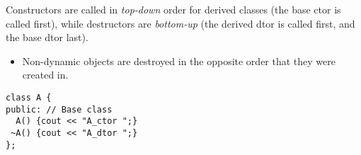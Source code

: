 \documentclass[7pt, twocolumn]{extarticle}
\newcommand{\myinline}[1]{\lstinline[basicstyle={\fontsize{5pt}{6}\ttfamily}]{#1}}
\begin{document}
\begin{small}
\begin{minipage}[h]{4.4cm}
\vspace{0.35ex}
Constructors are called in \textit{top-down} order for derived classes (the base ctor is called first), while destructors are \textit{bottom-up} (the derived dtor is called first, and the base dtor last). 

\smallskip
\begin{itemize}[leftmargin=*,align=parleft]
\setlength\itemsep{0pt}
\item[\textcolor{info}{{\faInfoCircle}}] Non-dynamic objects are destroyed in the opposite order that they were created in.
\end{itemize}



\end{minipage}
\hspace{0pt}
\begin{minipage}[h]{5.8cm} 
\smallskip
\begin{tcbraster}[raster columns=2, sharp corners, raster before skip=3pt, raster after skip=0pt,
                  raster equal height, raster column skip=-.5mm]
\begin{tcolorbox}[top=-5pt,bottom=-5pt,left=-8pt,right=-1pt,center title,toptitle=-0.6mm,
  bottomtitle=-0.6mm,boxrule=0.5pt,arc=0pt]
{
\begin{lstlisting}[style = mystyle, numbers=none]
class A {
public: // Base class
  A() {cout << "A_ctor ";}
 ~A() {cout << "A_dtor ";} 
};
\end{lstlisting}
}
\end{tcolorbox}
\end{tcbraster}
\end{minipage}
\end{small}
\end{document}
